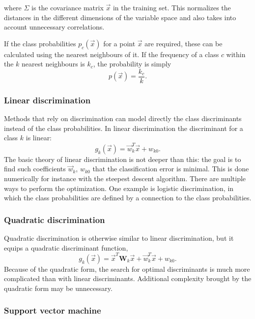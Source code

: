 \documentclass[twoside]{article}
\renewcommand{\v}[1]{\vec{#1}}
\begin{document}
\begin{multicols}{2}
where $\Sigma$ is the covariance matrix $\v{x}$ in the training set.
This normalizes the distances in the different dimensions of
the variable space and also takes into account unnecessary correlations.

If the class probabilities $p_c(\v{x})$ for a point $\v{x}$ are required, these can
be calculated using the nearest neighbours of it. If the frequency of a class $c$
within the $k$ nearest neighbours is $k_c$, the probability is simply
\begin{equation}
 p(\v{x}) = \frac{k_c}{k}.
\end{equation}

\subsubsection{Linear discrimination}\label{method:ldiskr}

Methods that rely on discrimination can model directly the class discriminants instead of
the class probabilities. In linear discrimination the discriminant for a class $k$ is linear:
\begin{equation}
 g_k(\v{x}) = \v{w}_k^T \v{x} + w_{k0}.
\end{equation}
The basic theory of linear discrimination is not deeper than this: the goal is to find such
coefficients $\v{w}_k$, $w_{k0}$ that the classification error is minimal. This is
done numerically for instance with the steepest descent algorithm. There are multiple 
ways to perform the optimization. One example
is logistic discrimination, in which the class probabilities are defined by a connection to the class
probabilities.

\subsubsection{Quadratic discrimination}\label{method:qdiskr}

Quadratic discrimination is otherwise similar to linear discrimination, but it equips a quadratic discriminant function,
\begin{equation}
 g_k(\v{x}) = \v{x}^T \mathbf{W}_k \v{x} + \v{w}_k^T \v{x} + w_{k0}.
\end{equation}
Because of the quadratic form, the search for optimal discriminants is much more complicated than with linear
discriminants. Additional complexity brought by the quadratic form may be unnecessary.

\subsubsection{Support vector machine}\label{method:svm}


\end{multicols}
\end{document}
